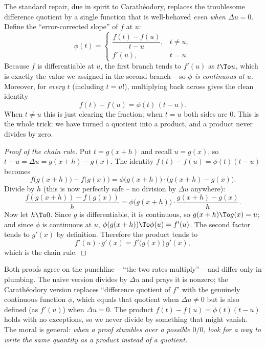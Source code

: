 The standard repair, due in spirit to Carath\'eodory, replaces the troublesome difference
quotient by a single function that is well-behaved \emph{even when $\Delta u = 0$}. Define
the ``error-corrected slope'' of $f$ at $u$:
\[
  \phi(t) =
  \begin{cases}
    \dfrac{f(t)-f(u)}{t-u}, & t\ne u,\\[1.0em]
    f'(u), & t = u.
  \end{cases}
\]
Because $f$ is differentiable at $u$, the first branch tends to $f'(u)$ as $t\To u$, which
is exactly the value we assigned in the second branch -- so \emph{$\phi$ is continuous at
$u$}. Moreover, for \emph{every} $t$ (including $t=u$!), multiplying back across gives the
clean identity
\[
  f(t)-f(u) = \phi(t)\,(t-u).
\]
When $t\ne u$ this is just clearing the fraction; when $t=u$ both sides are $0$. This is
the whole trick: we have turned a quotient into a product, and a product never divides by
zero.

\begin{proof}[Proof of the chain rule]
Put $t = g(x+h)$ and recall $u = g(x)$, so $t - u = \Delta u = g(x+h)-g(x)$. The identity
$f(t)-f(u)=\phi(t)(t-u)$ becomes
\[
  f\big(g(x+h)\big) - f\big(g(x)\big) = \phi\big(g(x+h)\big)\cdot\big(g(x+h)-g(x)\big).
\]
Divide by $h$ (this is now perfectly safe -- no division by $\Delta u$ anywhere):
\[
  \frac{f(g(x+h)) - f(g(x))}{h}
  = \phi\big(g(x+h)\big)\cdot\frac{g(x+h)-g(x)}{h}.
\]
Now let $h\To 0$. Since $g$ is differentiable, it is continuous, so $g(x+h)\To g(x)=u$;
and since $\phi$ is continuous at $u$, $\phi(g(x+h))\To \phi(u) = f'(u)$. The second factor
tends to $g'(x)$ by definition. Therefore the product tends to
\[
  f'(u)\cdot g'(x) = f'\big(g(x)\big)\,g'(x),
\]
which is the chain rule.
\end{proof}

\begin{whybox}
Both proofs agree on the punchline -- ``the two rates
multiply'' -- and differ only in plumbing. The naive version divides by $\Delta u$ and
prays it is nonzero; the Carath\'eodory version replaces ``difference quotient of $f$''
with the genuinely continuous function $\phi$, which equals that quotient when $\Delta u
\ne 0$ but is also defined (as $f'(u)$) when $\Delta u = 0$. The product
$f(t)-f(u)=\phi(t)(t-u)$ holds with no exceptions, so we never divide by something that
might vanish. The moral is general: \emph{when a proof stumbles over a possible $0/0$,
look for a way to write the same quantity as a product instead of a quotient.}
\end{whybox}

